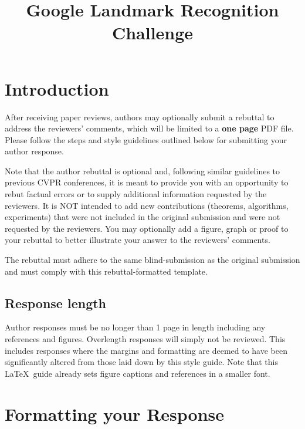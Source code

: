 \documentclass[10pt,twocolumn,letterpaper]{article}
\begin{document}
\title{Google Landmark Recognition Challenge}  %

\maketitle
\thispagestyle{empty}


\section{Introduction}

After receiving paper reviews, authors may optionally submit a rebuttal to address the reviewers' comments, which will be limited to a {\bf one page} PDF file.  Please follow the steps and style guidelines outlined below for submitting your author response.

Note that the author rebuttal is optional and, following similar guidelines to previous CVPR conferences, it is meant to provide you with an opportunity to rebut factual errors or to supply additional information requested by the reviewers. It is NOT intended to add new contributions (theorems, algorithms, experiments) that were not included in the original submission and were not requested by the reviewers. You may optionally add a figure, graph or proof to your rebuttal to better illustrate your answer to the reviewers' comments.

The rebuttal must adhere to the same blind-submission as the original submission and must comply with this rebuttal-formatted template.


\subsection{Response length}
Author responses must be no longer than 1 page in length including any references and figures.  Overlength responses will simply not be reviewed.  This includes responses where the margins and formatting are deemed to have been significantly altered from those laid down by this style guide.  Note that this \LaTeX\ guide already sets figure captions and references in a smaller font.

\section{Formatting your Response}
\end{document}
